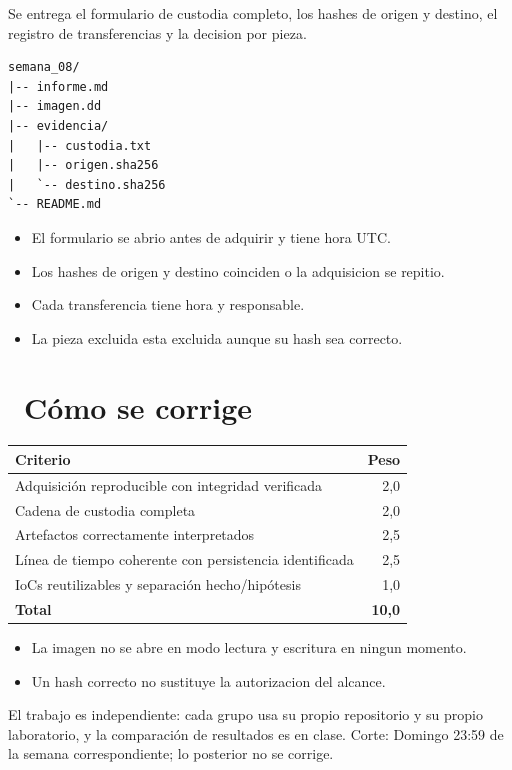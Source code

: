 \documentclass[11pt,a4paper]{article}
\newcommand{\iconotexto}[2]{\textcolor{cyanNeon}{\faIcon{#1}}~#2}
\begin{document}
Se entrega el formulario de custodia completo, los hashes de origen y destino, el registro de transferencias y la decision por pieza.

\begin{lstlisting}[style=estiloCodigo]
semana_08/
|-- informe.md
|-- imagen.dd
|-- evidencia/
|   |-- custodia.txt
|   |-- origen.sha256
|   `-- destino.sha256
`-- README.md
\end{lstlisting}

\begin{itemize}[leftmargin=1.4em,itemsep=2pt,topsep=3pt]
  \item El formulario se abrio antes de adquirir y tiene hora UTC.
  \item Los hashes de origen y destino coinciden o la adquisicion se repitio.
  \item Cada transferencia tiene hora y responsable.
  \item La pieza excluida esta excluida aunque su hash sea correcto.
\end{itemize}

\section{\iconotexto{ruler-combined}{Cómo se corrige}}

\begin{tabularx}{\linewidth}{@{}X r@{}}
\toprule
Criterio & Peso\\
\midrule
Adquisición reproducible con integridad verificada & 2,0 \\
Cadena de custodia completa & 2,0 \\
Artefactos correctamente interpretados & 2,5 \\
Línea de tiempo coherente con persistencia identificada & 2,5 \\
IoCs reutilizables y separación hecho/hipótesis & 1,0 \\
\midrule
\textbf{Total} & \textbf{10,0}\\
\bottomrule
\end{tabularx}

\begin{itemize}[leftmargin=1.4em,itemsep=2pt,topsep=3pt]
  \item La imagen no se abre en modo lectura y escritura en ningun momento.
  \item Un hash correcto no sustituye la autorizacion del alcance.
\end{itemize}

\begin{cajaRecuerda}El trabajo es independiente: cada grupo usa su propio repositorio y su propio laboratorio, y la comparación de resultados es en clase. Corte: Domingo 23:59 de la semana correspondiente; lo posterior no se corrige.
\end{cajaRecuerda}
\end{document}
